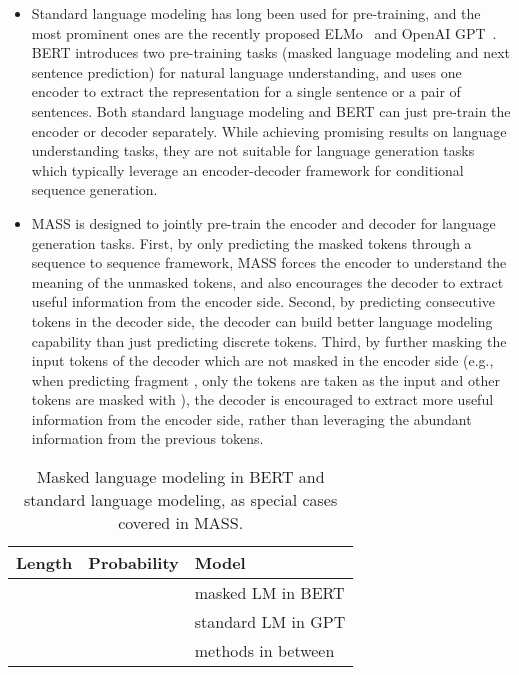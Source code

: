 \documentclass{article}
\begin{document}
\begin{itemize}
		\item Standard language modeling has long been used for pre-training, and the most prominent ones are the recently proposed ELMo~\citep{peters2018deep} and OpenAI GPT~\citep{radford2018improving}. BERT introduces two pre-training tasks (masked language modeling and next sentence prediction) for natural language understanding, and uses one encoder to extract the representation for a single sentence or a pair of sentences. Both standard language modeling and BERT can just pre-train the encoder or decoder separately. While achieving promising results on language understanding tasks, they are not suitable for language generation tasks which typically leverage an encoder-decoder framework for conditional sequence generation.
		
		\item MASS is designed to jointly pre-train the encoder and decoder for language generation tasks. First, by only predicting the masked tokens through a sequence to sequence framework, MASS forces the encoder to understand the meaning of the unmasked tokens, and also encourages the decoder to extract useful information from the encoder side. Second, by predicting consecutive tokens in the decoder side, the decoder can build better language modeling capability than just predicting discrete tokens. Third, by further masking the input tokens of the decoder which are not masked in the encoder side (e.g., when predicting fragment , only the tokens  are taken as the input and other tokens are masked with ), the decoder is encouraged to extract more useful information from the encoder side, rather than leveraging the abundant information from the previous tokens. 
	\end{itemize}




	
	\begin{table}[!t]
		\small
		\centering
		\begin{tabular}{l |l |l}
			\toprule
			Length & Probability & Model \\
			\midrule
			 &  & masked LM in BERT   \\
			 &  & standard LM in GPT\\
			 & & methods in between \\
			\bottomrule
		\end{tabular}
		\caption{Masked language modeling in BERT and standard language modeling, as special cases covered in MASS.}
		\label{tab_unified}
	\end{table}	
	
\end{document}
